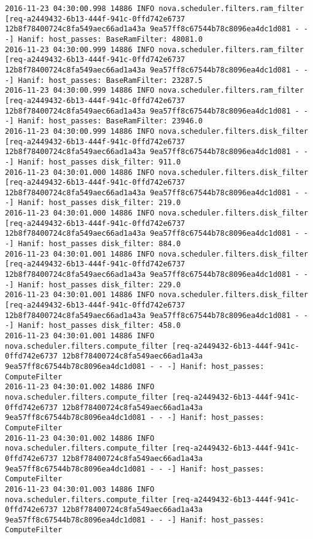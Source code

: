 \begin{lstlisting}[frame=single, caption={The filter scheduler log trace for 10 virtual instances}, label={lst:filterschedulercodetracelog10vi}, escapechar=|]
2016-11-23 04:30:00.998 14886 INFO nova.scheduler.filters.ram_filter [req-a2449432-6b13-444f-941c-0ffd742e6737 12b8f78400724c8fa549aec66ad1a43a 9ea57ff8c67544b78c8096ea4dc1d081 - - -] Hanif: host_passes: BaseRamFilter: 48081.0
2016-11-23 04:30:00.999 14886 INFO nova.scheduler.filters.ram_filter [req-a2449432-6b13-444f-941c-0ffd742e6737 12b8f78400724c8fa549aec66ad1a43a 9ea57ff8c67544b78c8096ea4dc1d081 - - -] Hanif: host_passes: BaseRamFilter: 23287.5
2016-11-23 04:30:00.999 14886 INFO nova.scheduler.filters.ram_filter [req-a2449432-6b13-444f-941c-0ffd742e6737 12b8f78400724c8fa549aec66ad1a43a 9ea57ff8c67544b78c8096ea4dc1d081 - - -] Hanif: host_passes: BaseRamFilter: 23946.0
2016-11-23 04:30:00.999 14886 INFO nova.scheduler.filters.disk_filter [req-a2449432-6b13-444f-941c-0ffd742e6737 12b8f78400724c8fa549aec66ad1a43a 9ea57ff8c67544b78c8096ea4dc1d081 - - -] Hanif: host_passes disk_filter: 911.0
2016-11-23 04:30:01.000 14886 INFO nova.scheduler.filters.disk_filter [req-a2449432-6b13-444f-941c-0ffd742e6737 12b8f78400724c8fa549aec66ad1a43a 9ea57ff8c67544b78c8096ea4dc1d081 - - -] Hanif: host_passes disk_filter: 219.0
2016-11-23 04:30:01.000 14886 INFO nova.scheduler.filters.disk_filter [req-a2449432-6b13-444f-941c-0ffd742e6737 12b8f78400724c8fa549aec66ad1a43a 9ea57ff8c67544b78c8096ea4dc1d081 - - -] Hanif: host_passes disk_filter: 884.0
2016-11-23 04:30:01.001 14886 INFO nova.scheduler.filters.disk_filter [req-a2449432-6b13-444f-941c-0ffd742e6737 12b8f78400724c8fa549aec66ad1a43a 9ea57ff8c67544b78c8096ea4dc1d081 - - -] Hanif: host_passes disk_filter: 229.0
2016-11-23 04:30:01.001 14886 INFO nova.scheduler.filters.disk_filter [req-a2449432-6b13-444f-941c-0ffd742e6737 12b8f78400724c8fa549aec66ad1a43a 9ea57ff8c67544b78c8096ea4dc1d081 - - -] Hanif: host_passes disk_filter: 458.0
2016-11-23 04:30:01.001 14886 INFO nova.scheduler.filters.compute_filter [req-a2449432-6b13-444f-941c-0ffd742e6737 12b8f78400724c8fa549aec66ad1a43a 9ea57ff8c67544b78c8096ea4dc1d081 - - -] Hanif: host_passes: ComputeFilter
2016-11-23 04:30:01.002 14886 INFO nova.scheduler.filters.compute_filter [req-a2449432-6b13-444f-941c-0ffd742e6737 12b8f78400724c8fa549aec66ad1a43a 9ea57ff8c67544b78c8096ea4dc1d081 - - -] Hanif: host_passes: ComputeFilter
2016-11-23 04:30:01.002 14886 INFO nova.scheduler.filters.compute_filter [req-a2449432-6b13-444f-941c-0ffd742e6737 12b8f78400724c8fa549aec66ad1a43a 9ea57ff8c67544b78c8096ea4dc1d081 - - -] Hanif: host_passes: ComputeFilter
2016-11-23 04:30:01.003 14886 INFO nova.scheduler.filters.compute_filter [req-a2449432-6b13-444f-941c-0ffd742e6737 12b8f78400724c8fa549aec66ad1a43a 9ea57ff8c67544b78c8096ea4dc1d081 - - -] Hanif: host_passes: ComputeFilter

\end{lstlisting}
